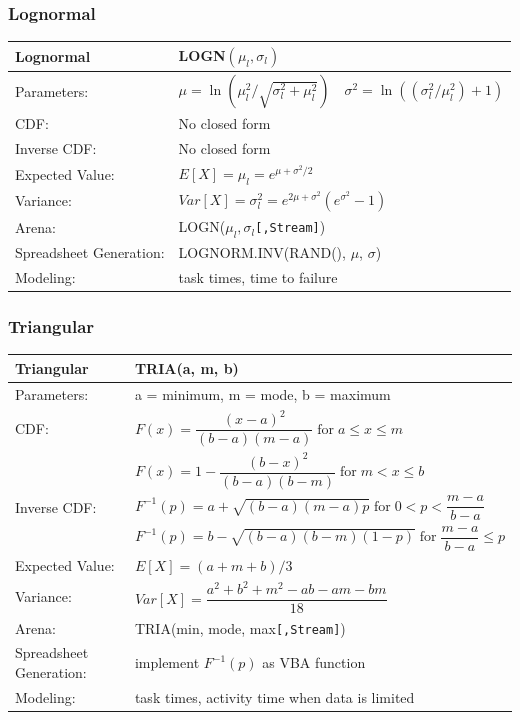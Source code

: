 \documentclass[
]{book}
\theoremstyle{definition}
\theoremstyle{definition}
\theoremstyle{definition}
\theoremstyle{definition}
\theoremstyle{remark}
\begin{document}
\hypertarget{lognormal}{%
\subsubsection*{Lognormal}\label{lognormal}}


\begin{longtable}[]{@{}ll@{}}
\toprule
\textbf{Lognormal} & LOGN\(\left(\mu_l,\sigma_l\right)\) \\
\midrule
\endhead
Parameters: & \(\mu = \ln\left(\mu_{l}^{2}/\sqrt{\sigma_{l}^{2} + \mu_{l}^{2}}\right) \quad \sigma^{2} = \ln\left((\sigma_{l}^{2}/\mu_{l}^{2}) + 1\right)\) \\
CDF: & No closed form \\
Inverse CDF: & No closed form \\
Expected Value: & \(E[X] = \mu_l = e^{\mu + \sigma^{2}/2}\) \\
Variance: & \(Var[X] = \sigma_{l}^{2} = e^{2\mu + \sigma^{2}}\left(e^{\sigma^{2}} - 1\right)\) \\
Arena: & LOGN(\(\mu_l,\sigma_l\)\texttt{{[},Stream{]}}) \\
Spreadsheet Generation: & LOGNORM.INV(RAND(), \(\mu\), \(\sigma\)) \\
Modeling: & task times, time to failure \\
\bottomrule
\end{longtable}

\hypertarget{triangular}{%
\subsubsection*{Triangular}\label{triangular}}


\begin{longtable}[]{@{}ll@{}}
\toprule
\textbf{Triangular} & TRIA(a, m, b) \\
\midrule
\endhead
Parameters: & a = minimum, m = mode, b = maximum \\
CDF: & \(F(x) = \dfrac{(x - a)^2}{(b - a)(m - a)} \; \text{for} \; a \leq x \leq m\) \\
& \(F(x) = 1 - \dfrac{(b - x)^2}{(b - a)(b - m)} \; \text{for} \;m < x \leq b\) \\
Inverse CDF: & \(F^{-1}(p) = a + \sqrt{(b-a)(m-a)p} \; \text{for} \; 0 < p < \dfrac{m-a}{b-a}\) \\
& \(F^{-1}(p) = b - \sqrt{(b-a)(b-m)(1-p)} \; \text{for} \; \dfrac{m-a}{b-a} \leq p\) \\
Expected Value: & \(E[X] = (a+m+b)/3\) \\
Variance: & \(Var[X] = \dfrac{a^2 + b^2 + m^2 -ab -am -bm}{18}\) \\
Arena: & TRIA(min, mode, max\texttt{{[},Stream{]}}) \\
Spreadsheet Generation: & implement \(F^{-1}(p)\) as VBA function \\
Modeling: & task times, activity time when data is limited \\
\bottomrule
\end{longtable}
\end{document}
